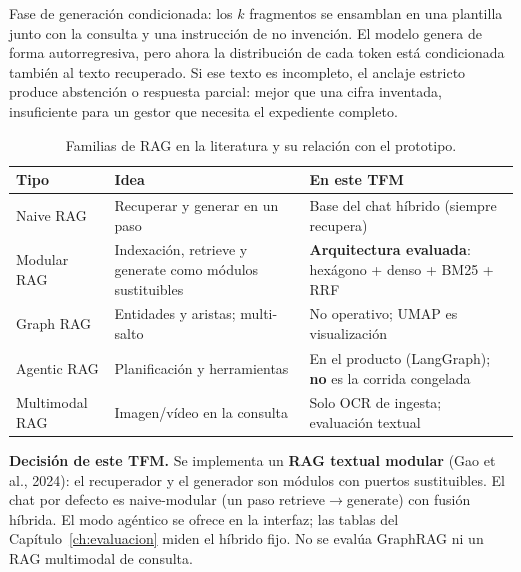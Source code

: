 Fase de generación condicionada: los $k$ fragmentos se ensamblan en una plantilla junto con la consulta y una instrucción de no invención. El modelo genera de forma autorregresiva, pero ahora la distribución de cada token está condicionada también al texto recuperado. Si ese texto es incompleto, el anclaje estricto produce abstención o respuesta parcial: mejor que una cifra inventada, insuficiente para un gestor que necesita el expediente completo.

\begin{table}[htbp]
\centering
\caption{Familias de RAG en la literatura y su relación con el prototipo.}
\label{tab:rag-tipos}
\begin{tabular}{p{3.2cm}p{5.4cm}p{5.4cm}}
\toprule
\textbf{Tipo} & \textbf{Idea} & \textbf{En este TFM} \\
\midrule
Naive RAG & Recuperar y generar en un paso & Base del chat híbrido (siempre recupera) \\
Modular RAG & Indexación, retrieve y generate como módulos sustituibles & \textbf{Arquitectura evaluada}: hexágono + denso + BM25 + RRF \\
Graph RAG & Entidades y aristas; multi-salto & No operativo; UMAP es visualización \\
Agentic RAG & Planificación y herramientas & En el producto (LangGraph); \textbf{no} es la corrida congelada \\
Multimodal RAG & Imagen/vídeo en la consulta & Solo OCR de ingesta; evaluación textual \\
\bottomrule
\end{tabular}
\end{table}

\textbf{Decisión de este TFM.} Se implementa un \textbf{RAG textual modular} (Gao et al., 2024): el recuperador y el generador son módulos con puertos sustituibles. El chat por defecto es naive-modular (un paso retrieve$\rightarrow$generate) con fusión híbrida. El modo agéntico se ofrece en la interfaz; las tablas del Capítulo~\ref{ch:evaluacion} miden el híbrido fijo. No se evalúa GraphRAG ni un RAG multimodal de consulta.

